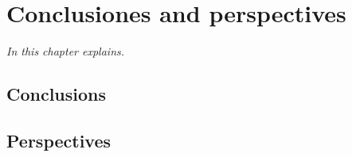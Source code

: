 \chapter{Conclusiones and perspectives}
\label{chap:chap3}
\textit{In this chapter explains.}
\vfill
\minitoc
\newpage

\allowdisplaybreaks
\section{Conclusions}

\section{Perspectives}
